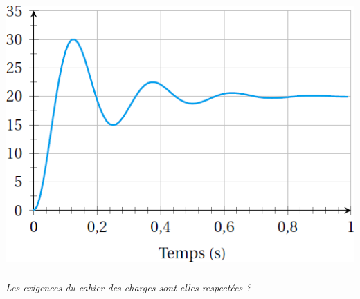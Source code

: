 \documentclass[10pt,fleqn]{article} %
\begin{document}
\begin{multicols}{2}
\begin{center}
\includegraphics[width=\linewidth]{images/fig_05}
\end{center}

\subparagraph{}\textit{Les exigences du cahier des charges sont-elles respectées ?}


\end{multicols}
\end{document}
